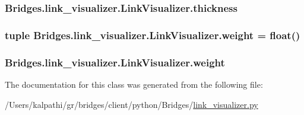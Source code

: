 \subsubsection[{thickness}]{\setlength{\rightskip}{0pt plus 5cm}Bridges.\+link\+\_\+visualizer.\+Link\+Visualizer.\+thickness}\label{class_bridges_1_1link__visualizer_1_1_link_visualizer_acbc2abcd8584b20c14f3aa695cb5a668}
\hypertarget{class_bridges_1_1link__visualizer_1_1_link_visualizer_a95a85a4c31c0af26ece7229bc679032d}{}
\subsubsection[{weight}]{\setlength{\rightskip}{0pt plus 5cm}tuple Bridges.\+link\+\_\+visualizer.\+Link\+Visualizer.\+weight = float()\hspace{0.3cm}{\ttfamily [static]}}\label{class_bridges_1_1link__visualizer_1_1_link_visualizer_a95a85a4c31c0af26ece7229bc679032d}
\hypertarget{class_bridges_1_1link__visualizer_1_1_link_visualizer_a3cf821801816ca20db68e8122b159e96}{}
\subsubsection[{weight}]{\setlength{\rightskip}{0pt plus 5cm}Bridges.\+link\+\_\+visualizer.\+Link\+Visualizer.\+weight}\label{class_bridges_1_1link__visualizer_1_1_link_visualizer_a3cf821801816ca20db68e8122b159e96}


The documentation for this class was generated from the following file\+:\begin{DoxyCompactItemize}
\item 
/\+Users/kalpathi/gr/bridges/client/python/\+Bridges/\hyperlink{link__visualizer_8py}{link\+\_\+visualizer.\+py}\end{DoxyCompactItemize}

